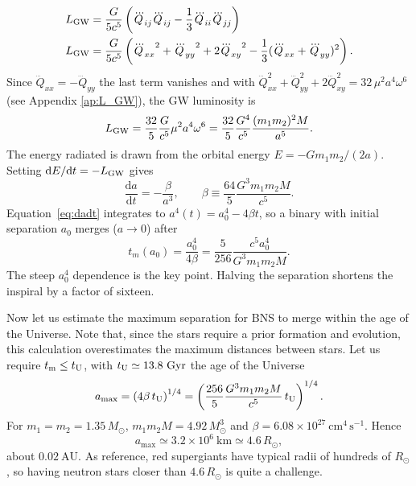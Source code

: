 \begin{align}
  L_{\rm GW} &= \frac{G}{5c^{5}}\left ( \dddot{Q}_{ij}\dddot{Q}_{ij}-\frac{1}{3}\dddot{Q}_{ii}\dddot{Q}_{jj}\right )\\
  L_{\rm GW} &= \frac{G}{5c^{5}}\left ( {\dddot{Q}_{xx}}^2 + {\dddot{Q}_{yy}}^2+2{\dddot{Q}_{xy}}^2 -\frac{1}{3}(\dddot{Q}_{xx} + \dddot{Q}_{yy} )^2 \right ).
\end{align}
Since $\dddot Q_{xx}=-\dddot Q_{yy}$ the last term vanishes and with $\dddot{Q}_{xx}^{2} + \dddot{Q}_{yy}^{2} + 2\dddot{Q}_{xy}^{2}
= 32\,\mu^{2} a^{4}\omega^{6}$ (see Appendix \ref{ap:L_GW}), the GW luminosity is
\begin{equation}\label{eq:lgw}
  L_{\rm GW} = \frac{32}{5}\frac{G}{c^{5}}\mu^{2}a^{4}\omega^{6}
             = \frac{32}{5}\frac{G^{4}}{c^{5}}\frac{(m_1 m_2)^{2} M}{a^{5}} .
\end{equation}
The energy radiated is drawn from the orbital energy $E = -G m_1 m_2/(2a)$. Setting $\mathrm{d}E/\mathrm{d}t = -L_{\rm GW}$ gives
\begin{equation}\label{eq:dadt}
  \frac{\mathrm{d}a}{\mathrm{d}t} = -\frac{\beta}{a^{3}}, \qquad
  \beta \equiv \frac{64}{5}\frac{G^{3} m_1 m_2 M}{c^{5}} .
\end{equation}
Equation~\ref{eq:dadt} integrates to $a^{4}(t) = a_0^{4} - 4\beta t$, so a binary with initial separation $a_0$ merges ($a \to 0$) after
\begin{equation}\label{eq:tc}
  t_m(a_0) = \frac{a_0^{4}}{4\beta}
  = \frac{5}{256}\frac{c^{5} a_0^{4}}{G^{3} m_1 m_2 M} .
\end{equation}
The steep $a_0^{4}$ dependence is the key point. 
Halving the separation shortens the inspiral by a factor of sixteen.

Now let us estimate the maximum separation for BNS to merge within the age of the Universe.
Note that, since the stars require a prior formation and evolution, this calculation overestimates the maximum distances between stars.
Let us require $t_{\rm m} \le t_{\rm U}$, with $t_{\rm U} \simeq 13.8~\mathrm{Gyr}$ the age of the Universe
\begin{equation}\label{eq:amax}
  a_{\max} = \left(4\beta\, t_{\rm U}\right)^{1/4}
  = \left(\frac{256}{5}\frac{G^{3} m_1 m_2 M}{c^{5}}\, t_{\rm U}\right)^{1/4} .
\end{equation} 
For $m_1 = m_2 = 1.35\,M_\odot$, $m_1 m_2 M = 4.92\,M_\odot^{3}$ and $\beta = 6.08\times10^{27}~\mathrm{cm^{4}\,s^{-1}}$. Hence
\begin{equation}\label{eq:amax-num}
  a_{\max} \simeq 3.2\times10^{6}~\mathrm{km}\simeq 4.6\,R_\odot ,
\end{equation}
about $0.02~\mathrm{AU}$. As reference, red supergiants have typical radii of hundreds of $R_\odot$, so having neutron stars closer than $4.6\,R_\odot$ is quite a challenge.

